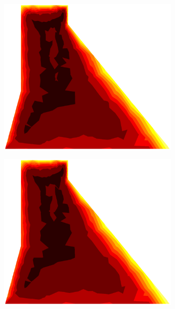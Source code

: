 \documentclass[10pt, a4paper]{article}
\begin{document}
\begin{figure}[H]
\begin{subfigure}[H]{0.19\textwidth}
		\includegraphics[width=1.2\textwidth]{fig/20.eps}
	\end{subfigure}
	\begin{subfigure}[H]{0.19\textwidth}
		\includegraphics[width=1.2\textwidth]{fig/21.eps}
	\end{subfigure}
	\begin{subfigure}[H]{0.19\textwidth}

\end{subfigure}
\end{figure}
\end{document}
